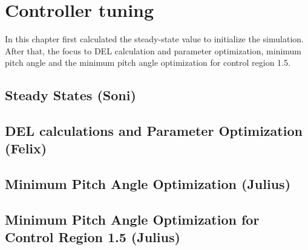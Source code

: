\chapter{Controller tuning}

In this chapter first calculated the steady-state value to initialize the simulation. After that, the focus to DEL calculation and parameter optimization, minimum pitch angle and the minimum pitch angle optimization for control region 1.5.


\section{Steady States (Soni)} \label{steady states}


\section{DEL calculations and Parameter Optimization (Felix)} \label{DLC 1.2 tuning}


\section{Minimum Pitch Angle Optimization (Julius)} \label{minimum pitch angle static}


\section{Minimum Pitch Angle Optimization for Control Region 1.5 (Julius)} 

